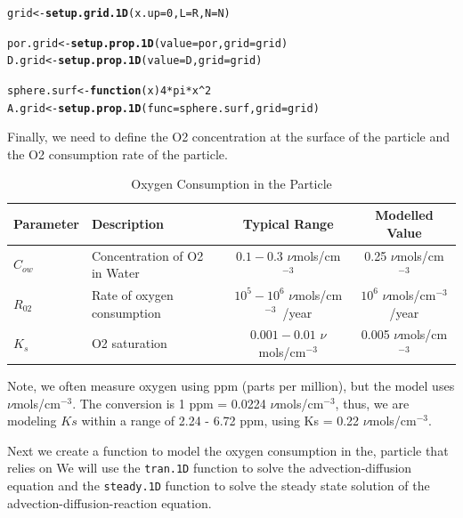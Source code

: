 \documentclass{tufte-handout}\usepackage[]{graphicx}\usepackage[]{xcolor}
\makeatletter
\newcommand{\hlnum}[1]{\textcolor[rgb]{0.686,0.059,0.569}{#1}}%
\newcommand{\hlopt}[1]{\textcolor[rgb]{0,0,0}{#1}}%
\newcommand{\hlstd}[1]{\textcolor[rgb]{0.345,0.345,0.345}{#1}}%
\newcommand{\hlkwa}[1]{\textcolor[rgb]{0.161,0.373,0.58}{\textbf{#1}}}%
\newcommand{\hlkwb}[1]{\textcolor[rgb]{0.69,0.353,0.396}{#1}}%
\newcommand{\hlkwc}[1]{\textcolor[rgb]{0.333,0.667,0.333}{#1}}%
\newcommand{\hlkwd}[1]{\textcolor[rgb]{0.737,0.353,0.396}{\textbf{#1}}}%
\newenvironment{kframe}{%
 \def\at@end@of@kframe{}%
 \ifinner\ifhmode%
  \def\at@end@of@kframe{\end{minipage}}%
  \begin{minipage}{\columnwidth}%
 \fi\fi%
 \def\FrameCommand##1{\hskip\@totalleftmargin \hskip-\fboxsep
 \colorbox{shadecolor}{##1}\hskip-\fboxsep
     \hskip-\linewidth \hskip-\@totalleftmargin \hskip\columnwidth}%
 \MakeFramed {\advance\hsize-\width
   \@totalleftmargin\z@ \linewidth\hsize
   \@setminipage}}%
 {\par\unskip\endMakeFramed%
 \at@end@of@kframe}
\newenvironment{knitrout}{}{} %
\newcommand{\numolspercm}{$\nu$mols/cm$^{-3}$}
\makeatother
\begin{document}
\begin{knitrout}
\color{fgcolor}\begin{kframe}
\begin{alltt}
\hlstd{grid} \hlkwb{<-} \hlkwd{setup.grid.1D}\hlstd{(}\hlkwc{x.up}\hlstd{=}\hlnum{0}\hlstd{,} \hlkwc{L} \hlstd{= R,} \hlkwc{N} \hlstd{= N)}

\hlstd{por.grid} \hlkwb{<-} \hlkwd{setup.prop.1D}\hlstd{(}\hlkwc{value}\hlstd{=por,} \hlkwc{grid}\hlstd{=grid)}
\hlstd{D.grid} \hlkwb{<-} \hlkwd{setup.prop.1D}\hlstd{(}\hlkwc{value}\hlstd{=D,} \hlkwc{grid}\hlstd{=grid)}

\hlstd{sphere.surf} \hlkwb{<-} \hlkwa{function}\hlstd{(}\hlkwc{x}\hlstd{)} \hlnum{4}\hlopt{*}\hlstd{pi}\hlopt{*}\hlstd{x}\hlopt{^}\hlnum{2}
\hlstd{A.grid} \hlkwb{<-} \hlkwd{setup.prop.1D}\hlstd{(}\hlkwc{func}\hlstd{=sphere.surf,}  \hlkwc{grid}\hlstd{=grid)}
\end{alltt}
\end{kframe}
\end{knitrout}

Finally, we need to define the O2 concentration at the surface of the particle and the O2 consumption rate of the particle. 

\begin{table}[h]
\caption{Oxygen Consumption in the Particle}
\centering
\begin{tabular}{|l|l|c|c|} \hline
Parameter & Description & Typical Range &  Modelled Value \\ \hline\hline
\( C_{ow} \) & Concentration of O2 in Water & \( 0.1 - 0.3 \) \numolspercm &  0.25 \numolspercm \\
\( R_{02} \) & Rate of oxygen consumption & \( 10^5 - 10^6 \) \numolspercm~/year &  \ensuremath{10^{6}} \numolspercm/year \\
\( K_s \) & O2 saturation & \( 0.001 - 0.01 \) \numolspercm &  0.005 \numolspercm \\ \hline
\end{tabular}
\end{table}

Note, we often measure oxygen using ppm (parts per million), but the model uses \numolspercm. The conversion is 1 ppm = 0.0224 \numolspercm, thus, we are modeling \(Ks \) within a range of 2.24 - 6.72 ppm, using Ks = 0.22 \numolspercm.


Next we create a function to model the oxygen consumption in the, particle that relies on We will use the \texttt{tran.1D} function to solve the advection-diffusion equation and the \texttt{steady.1D} function to solve the steady state solution of the advection-diffusion-reaction equation.
\end{document}

